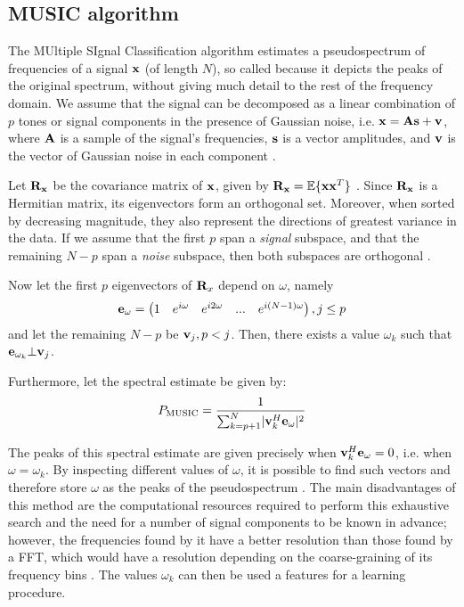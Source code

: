 \documentclass[../main.tex]{subfiles} \label{chapter_soa}
\begin{document}
\subsection{MUSIC algorithm} \label{subsection_music}
The MUltiple SIgnal Classification algorithm estimates a pseudospectrum of frequencies of a signal $\mathbf{x}$ (of length $N$), so called because it depicts the peaks of the original spectrum, without giving much detail to the rest of the frequency domain. We assume that the signal can be decomposed as a linear combination of $p$ tones or signal components in the presence of Gaussian noise, i.e. $\mathbf{x} = \mathbf{As} + \mathbf{v}$, where $\mathbf{A}$ is a sample of the signal's frequencies, $\mathbf{s}$ is a vector amplitudes, and $\mathbf{v}$ is the vector of Gaussian noise in each component \cite{Evans}.
\par Let $\mathbf{R_x}$ be the covariance matrix of $\mathbf{x}$, given by $\mathbf{R_x} = \mathbb{E}\{\mathbf{xx}^T\}$ \cite{Evans}. Since $\mathbf{R_x}$ is a Hermitian matrix, its eigenvectors form an orthogonal set. Moreover, when sorted by decreasing magnitude, they also represent the directions of greatest variance in the data. If we assume that the first $p$ span a \emph{signal} subspace, and that the remaining $N-p$ span a \emph{noise} subspace, then both subspaces are orthogonal \cite{Systems1989}. 
\par Now let the first $p$ eigenvectors of $\mathbf{R}_x$ depend on $\omega$, namely
\begin{align*}
\mathbf{e}_{\omega} = \begin{pmatrix}1&e^{i\omega}&e^{i2\omega}&...&e^{i(N-1)\omega}\end{pmatrix}, j \leq p
\end{align*}
and let the remaining $N-p$ be $\mathbf{v}_j, p < j$. Then, there exists a value $\omega_{k}$ such that $\mathbf{e}_{\omega_k}\bot\mathbf{v}_j$. 
\par Furthermore, let the spectral estimate \cite{Kootsookos1999, Mathworks2015} be given by:
\begin{align*}
P_\text{MUSIC} = \frac{1}{\sum_{k=p+1}^{N}\lvert\mathbf{v}_k^H\mathbf{e}_{\omega}\rvert^2}
\end{align*}
\par The peaks of this spectral estimate are given precisely when $\mathbf{v}_k^H\mathbf{e}_{\omega} = 0$, i.e. when $\omega = \omega_k$. By inspecting different values of $\omega$, it is possible to find such vectors and therefore store $\omega$ as the peaks of the pseudospectrum \cite{Delft2011}. The main disadvantages of this method are the computational resources required to perform this exhaustive search and the need for a number of signal components to be known in advance; however, the frequencies found by it have a better resolution than those found by a FFT, which would have a resolution depending on the coarse-graining of its frequency bins \cite{Kootsookos1999}. The values $\omega_k$ can then be used a features for a learning procedure.
\end{document}
